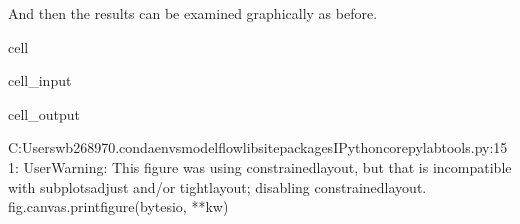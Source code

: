 \documentclass[letterpaper,10pt,english]{jupyterBook}
\begin{document}
\sphinxAtStartPar
{}

\sphinxAtStartPar
And then the results can be examined graphically as before.

\begin{sphinxuseclass}{cell}\begin{sphinxVerbatimInput}

\begin{sphinxuseclass}{cell_input}
\begin{sphinxVerbatim}[commandchars=\\\{\}]
   
\PYG{p}{[}\PYG{p}{]}
\end{sphinxVerbatim}

\end{sphinxuseclass}\end{sphinxVerbatimInput}
\begin{sphinxVerbatimOutput}

\begin{sphinxuseclass}{cell_output}
\begin{sphinxVerbatim}[commandchars=\\\{\}]
C:\PYGZbs{}Users\PYGZbs{}wb268970\PYGZbs{}.conda\PYGZbs{}envs\PYGZbs{}modelflow\PYGZbs{}lib\PYGZbs{}site\PYGZhy{}packages\PYGZbs{}IPython\PYGZbs{}core\PYGZbs{}pylabtools.py:151: UserWarning: This figure was using constrained\PYGZus{}layout, but that is incompatible with subplots\PYGZus{}adjust and/or tight\PYGZus{}layout; disabling constrained\PYGZus{}layout.
  fig.canvas.print\PYGZus{}figure(bytes\PYGZus{}io, **kw)
\end{sphinxVerbatim}

\noindent{}

\end{sphinxuseclass}\end{sphinxVerbatimOutput}

\end{sphinxuseclass}
\end{document}
